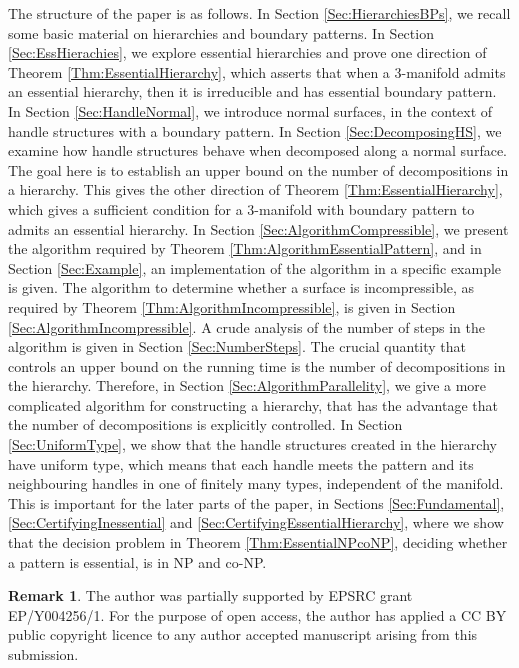 \documentclass[oneside]{amsart}
\numberwithin{equation}{section}
\theoremstyle{plain}
\theoremstyle{definition}
\newtheorem{remark}[equation]{Remark}
\begin{document}
The structure of the paper is as follows. In Section \ref{Sec:HierarchiesBPs}, we recall some basic material on hierarchies and boundary patterns. In Section \ref{Sec:EssHierachies}, we explore essential hierarchies and prove one direction of Theorem \ref{Thm:EssentialHierarchy}, which asserts that when a 3-manifold admits an essential hierarchy, then it is irreducible and has essential boundary pattern. In Section \ref{Sec:HandleNormal}, we introduce normal surfaces, in the context of handle structures with a boundary pattern. In Section \ref{Sec:DecomposingHS}, we examine how handle structures behave when decomposed along a normal surface. The goal here is to establish an upper bound on the number of decompositions in a hierarchy. This gives the other direction of Theorem \ref{Thm:EssentialHierarchy}, which gives a sufficient condition for a 3-manifold with boundary pattern to admits an essential hierarchy. In Section \ref{Sec:AlgorithmCompressible}, we present the algorithm required by Theorem \ref{Thm:AlgorithmEssentialPattern}, and in Section \ref{Sec:Example}, an implementation of the algorithm in a specific example is given. The algorithm to determine whether a surface is incompressible, as required by Theorem \ref{Thm:AlgorithmIncompressible}, is given in Section \ref{Sec:AlgorithmIncompressible}. A crude analysis of the number of steps in the algorithm is given in Section \ref{Sec:NumberSteps}. The crucial quantity that controls an upper bound on the running time is the number of decompositions in the hierarchy. Therefore, in Section \ref{Sec:AlgorithmParallelity}, we give a more complicated algorithm for constructing a hierarchy, that has the advantage that the number of decompositions is explicitly controlled. In Section \ref{Sec:UniformType}, we show that the handle structures created in the hierarchy have uniform type, which means that each handle meets the pattern and its neighbouring handles in one of finitely many types, independent of the manifold. This is important for the later parts of the paper, in Sections \ref{Sec:Fundamental}, \ref{Sec:CertifyingInessential} and \ref{Sec:CertifyingEssentialHierarchy}, where we show that the decision problem in Theorem \ref{Thm:EssentialNPcoNP}, deciding whether a pattern is essential, is in NP and co-NP.

\begin{remark} The author was partially supported by EPSRC grant EP/Y004256/1. For the purpose of open access, the author has applied a CC BY public copyright licence to any author accepted manuscript arising from this submission.
\end{remark}
\end{document}
